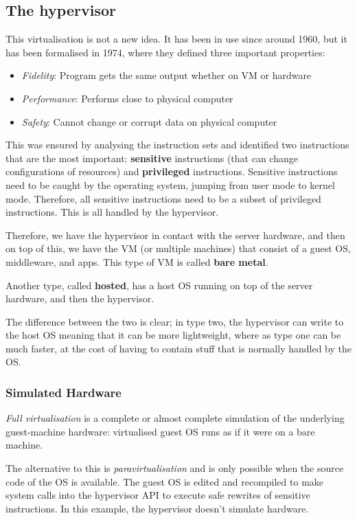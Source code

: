 \documentclass[11pt,a4paper,titlepage,dvipsnames,cmyk]{scrartcl}
\begin{document}
\subsection{The hypervisor}


This virtualisation is not a new idea. It has been in use since around 1960, but it has been formalised in 1974, where they defined three important properties:
\begin{itemize}
    \item \textit{Fidelity}: Program gets the same output whether on VM or hardware
    \item \textit{Performance}: Performs close to physical computer
    \item \textit{Safety}: Cannot change or corrupt data on physical computer
\end{itemize}

This was ensured by analysing the instruction sets and identified two instructions that are the most important: \textbf{sensitive} instructions (that can change configurations of resources) and \textbf{privileged} instructions. Sensitive instructions need to be caught by the operating system, jumping from user mode to kernel mode. Therefore, all sensitive instructions need to be a subset of privileged instructions. This is all handled by the hypervisor.

Therefore, we have the hypervisor in contact with the server hardware, and then on top of this, we have the VM (or multiple machines) that consist of a guest OS, middleware, and apps. This type of VM is called \textbf{bare metal}.

Another type, called \textbf{hosted}, has a host OS running on top of the server hardware, and then the hypervisor.

The difference between the two is clear; in type two, the hypervisor can write to the host OS meaning that it can be more lightweight, where as type one can be much faster, at the cost of having to contain stuff that is normally handled by the OS.

\subsubsection{Simulated Hardware}
\textit{Full virtualisation} is a complete or almost complete simulation of the underlying guest-machine hardware: virtualised guest OS runs as if it were on a bare machine.

The alternative to this is \textit{paravirtualisation} and is only possible when the source code of the OS is available. The guest OS is edited and recompiled to make system calls into the hypervisor API to execute safe rewrites of sensitive instructions. In this example, the hypervisor doesn't simulate hardware.
\end{document}
